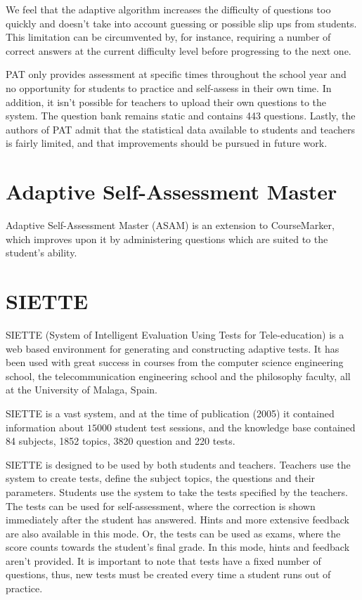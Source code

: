 We feel that the adaptive algorithm increases the difficulty of questions too quickly and doesn't take into account guessing or possible slip ups from students. This limitation can be circumvented by, for instance, requiring a number of correct answers at the current difficulty level before progressing to the next one.\newline

PAT only provides assessment at specific times throughout the school year and no opportunity for students to practice and self-assess in their own time. In addition, it isn't possible for teachers to upload their own questions to the system. The question bank remains static and contains 443 questions. Lastly, the authors of PAT admit that the statistical data available to students and teachers is fairly limited, and that improvements should be pursued in future work.

\section{Adaptive Self-Assessment Master}
Adaptive Self-Assessment Master (ASAM) is an extension to CourseMarker, which improves upon it by administering questions which are suited to the student's ability.

\section{SIETTE}
\label{sec:SIETTE}
SIETTE\cite{SIETTE-small} (System of Intelligent Evaluation Using Tests for Tele-education) is a web based environment for generating and constructing adaptive tests. It has been used with great success in courses from the computer science engineering school, the telecommunication engineering school and the philosophy faculty, all at the University of Malaga, Spain.\newline

SIETTE is a vast system, and at the time of publication (2005) it contained information about $15000$ student test sessions, and the knowledge base contained 84 subjects, 1852 topics, 3820 question and 220 tests.\newline

SIETTE is designed to be used by both students and teachers. Teachers use the system to create tests, define the subject topics, the questions and their parameters. Students use the system to take the tests specified by the teachers. The tests can be used for self-assessment, where the correction is shown immediately after the student has answered. Hints and more extensive feedback are also available in this mode. Or, the tests can be used as exams, where the score counts towards the student's final grade. In this mode, hints and feedback aren't provided. It is important to note that tests have a fixed number of questions, thus, new tests must be created every time a student runs out of practice.\newline

